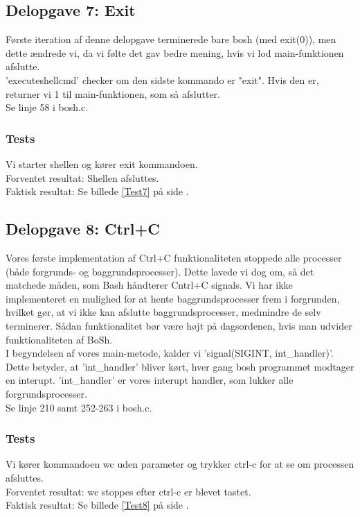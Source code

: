 \subsection{Delopgave 7: Exit}
\label{D7}
Første iteration af denne delopgave terminerede bare bosh (med exit(0)), men dette ændrede vi, da vi følte det gav bedre mening, hvis vi lod main-funktionen afslutte.
\\'executeshellcmd' checker om den sidste kommando er "exit". Hvis den er, returner vi 1 til main-funktionen, som så afslutter.
\\Se linje 58 i bosh.c.
\subsubsection{Tests}
Vi starter shellen og kører exit kommandoen.
\\Forventet resultat: Shellen afsluttes.
\\Faktisk resultat: Se billede \ref{Test7} på side \pageref{Test7}.

\subsection{Delopgave 8: Ctrl+C}
\label{D8}
Vores første implementation af Ctrl+C funktionaliteten stoppede alle processer (både forgrunds- og baggrundsprocesser). Dette lavede vi dog om, så det matchede måden, som Bash håndterer Cntrl+C signals. Vi har ikke implementeret en mulighed for at hente baggrundsprocesser frem i forgrunden, hvilket gør, at vi ikke kan afslutte baggrundsprocesser, medmindre de selv terminerer. Sådan funktionalitet bør være højt på dagsordenen, hvis man udvider funktionaliteten af BoSh.
\\I begyndelsen af vores main-metode, kalder vi 'signal(SIGINT, int\_handler)'. Dette betyder, at 'int\_handler' bliver kørt, hver gang bosh programmet modtager en interupt. 'int\_handler' er vores interupt handler, som lukker alle forgrundsprocesser. 
\\Se linje 210 samt 252-263 i bosh.c.
\subsubsection{Tests}
Vi kører kommandoen wc uden parameter og trykker ctrl-c for at se om processen afsluttes.
\\Forventet resultat: wc stoppes efter ctrl-c er blevet tastet.
\\Faktisk resultat: Se billede \ref{Test8} på side \pageref{Test8}.

